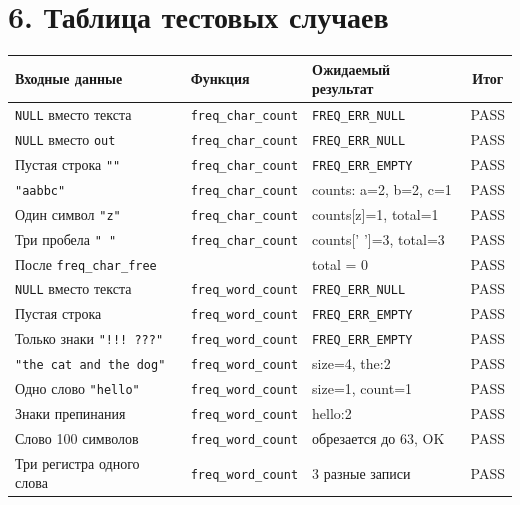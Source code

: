 \section*{6. Таблица тестовых случаев}

\begin{center}
\renewcommand{\arraystretch}{1.12}
\small
\begin{longtable}{p{4.2cm}|p{3.5cm}|p{3.2cm}|c}
\toprule
Входные данные & Функция & Ожидаемый результат & Итог \\
\midrule
\texttt{NULL} вместо текста      & \texttt{freq\_char\_count} & \texttt{FREQ\_ERR\_NULL}  & PASS \\
\texttt{NULL} вместо \texttt{out}& \texttt{freq\_char\_count} & \texttt{FREQ\_ERR\_NULL}  & PASS \\
Пустая строка \texttt{""}        & \texttt{freq\_char\_count} & \texttt{FREQ\_ERR\_EMPTY} & PASS \\
\texttt{"aabbc"}                 & \texttt{freq\_char\_count} & counts: a=2, b=2, c=1    & PASS \\
Один символ \texttt{"z"}         & \texttt{freq\_char\_count} & counts[z]=1, total=1      & PASS \\
Три пробела \texttt{"   "}       & \texttt{freq\_char\_count} & counts[' ']=3, total=3    & PASS \\
После \texttt{freq\_char\_free}  &                            & total = 0                 & PASS \\
\texttt{NULL} вместо текста      & \texttt{freq\_word\_count} & \texttt{FREQ\_ERR\_NULL}  & PASS \\
Пустая строка                    & \texttt{freq\_word\_count} & \texttt{FREQ\_ERR\_EMPTY} & PASS \\
Только знаки \texttt{"!!! ???"}  & \texttt{freq\_word\_count} & \texttt{FREQ\_ERR\_EMPTY} & PASS \\
\texttt{"the cat and the dog"}   & \texttt{freq\_word\_count} & size=4, the:2             & PASS \\
Одно слово \texttt{"hello"}      & \texttt{freq\_word\_count} & size=1, count=1           & PASS \\
Знаки препинания                 & \texttt{freq\_word\_count} & hello:2                   & PASS \\
Слово 100 символов               & \texttt{freq\_word\_count} & обрезается до 63, OK      & PASS \\
Три регистра одного слова        & \texttt{freq\_word\_count} & 3 разные записи           & PASS \\

\end{longtable}
\end{center}
